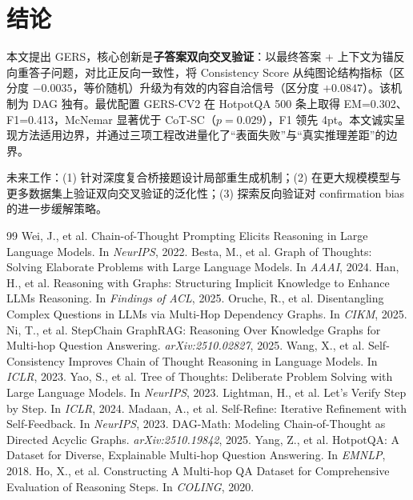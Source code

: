\documentclass[11pt,a4paper]{ctexart}
\begin{document}
\section{结论}

本文提出 GERS，核心创新是\textbf{子答案双向交叉验证}：以最终答案 + 上下文为锚反向重答子问题，对比正反向一致性，将 Consistency Score 从纯图论结构指标（区分度 $-0.0035$，等价随机）升级为有效的内容自洽信号（区分度 $+0.0847$）。该机制为 DAG 独有。最优配置 GERS-CV2 在 HotpotQA 500 条上取得 EM=0.302、F1=0.413，McNemar 显著优于 CoT-SC（$p=0.029$），F1 领先 4pt。本文诚实呈现方法适用边界，并通过三项工程改进量化了``表面失败''与``真实推理差距''的边界。

未来工作：(1) 针对深度复合桥接题设计局部重生成机制；(2) 在更大规模模型与更多数据集上验证双向交叉验证的泛化性；(3) 探索反向验证对 confirmation bias 的进一步缓解策略。

\begin{thebibliography}{99}
 Wei, J., et al. Chain-of-Thought Prompting Elicits Reasoning in Large Language Models. In \emph{NeurIPS}, 2022.
 Besta, M., et al. Graph of Thoughts: Solving Elaborate Problems with Large Language Models. In \emph{AAAI}, 2024.
 Han, H., et al. Reasoning with Graphs: Structuring Implicit Knowledge to Enhance LLMs Reasoning. In \emph{Findings of ACL}, 2025.
 Oruche, R., et al. Disentangling Complex Questions in LLMs via Multi-Hop Dependency Graphs. In \emph{CIKM}, 2025.
 Ni, T., et al. StepChain GraphRAG: Reasoning Over Knowledge Graphs for Multi-hop Question Answering. \emph{arXiv:2510.02827}, 2025.
 Wang, X., et al. Self-Consistency Improves Chain of Thought Reasoning in Language Models. In \emph{ICLR}, 2023.
 Yao, S., et al. Tree of Thoughts: Deliberate Problem Solving with Large Language Models. In \emph{NeurIPS}, 2023.
 Lightman, H., et al. Let's Verify Step by Step. In \emph{ICLR}, 2024.
 Madaan, A., et al. Self-Refine: Iterative Refinement with Self-Feedback. In \emph{NeurIPS}, 2023.
 DAG-Math: Modeling Chain-of-Thought as Directed Acyclic Graphs. \emph{arXiv:2510.19842}, 2025.
 Yang, Z., et al. HotpotQA: A Dataset for Diverse, Explainable Multi-hop Question Answering. In \emph{EMNLP}, 2018.
 Ho, X., et al. Constructing A Multi-hop QA Dataset for Comprehensive Evaluation of Reasoning Steps. In \emph{COLING}, 2020.
\end{thebibliography}
\end{document}
